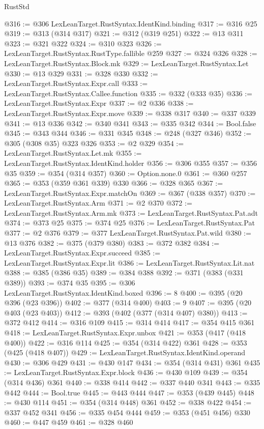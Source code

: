 \begin{lexlean}{RustStd}
\begin{coremodule}
@316 := @306 LexLeanTarget.RustSyntax.IdentKind.binding
@317 := @316 @25
@319 := @313 (@314 @317)
@321 := @312 (@319 @251)
@322 := @13 @311
@323 := @321 @322
@324 := @310 @323
@326 := LexLeanTarget.RustSyntax.RustType.fallible @259
@327 := @324 @326
@328 := LexLeanTarget.RustSyntax.Block.mk
@329 := LexLeanTarget.RustSyntax.Let
@330 := @13 @329
@331 := @328 @330
@332 := LexLeanTarget.RustSyntax.Expr.call
@333 := LexLeanTarget.RustSyntax.Callee.function
@335 := @332 (@333 @35)
@336 := LexLeanTarget.RustSyntax.Expr
@337 := @2 @336
@338 := LexLeanTarget.RustSyntax.Expr.move
@339 := @338 @317
@340 := @337 @339
@341 := @13 @336
@342 := @340 @341
@343 := @335 @342
@344 := Bool.false
@345 := @343 @344
@346 := @331 @345
@348 := @248 (@327 @346)
@352 := @305 (@308 @35) @323 @326
@353 := @2 @329
@354 := LexLeanTarget.RustSyntax.Let.mk
@355 := LexLeanTarget.RustSyntax.IdentKind.holder
@356 := @306 @355
@357 := @356 @35
@359 := @354 (@314 @357)
@360 := Option.none.{0}
@361 := @360 @257
@365 := @353 (@359 @361 @339) @330
@366 := @328 @365
@367 := LexLeanTarget.RustSyntax.Expr.matchOn
@369 := @367 (@338 @357)
@370 := LexLeanTarget.RustSyntax.Arm
@371 := @2 @370
@372 := LexLeanTarget.RustSyntax.Arm.mk
@373 := LexLeanTarget.RustSyntax.Pat.adt
@374 := @373 @25
@375 := @374 @25
@376 := LexLeanTarget.RustSyntax.Pat
@377 := @2 @376
@379 := @377 LexLeanTarget.RustSyntax.Pat.wild
@380 := @13 @376
@382 := @375 (@379 @380)
@383 := @372 @382
@384 := LexLeanTarget.RustSyntax.Expr.succeed
@385 := LexLeanTarget.RustSyntax.Expr.lit
@386 := LexLeanTarget.RustSyntax.Lit.nat
@388 := @385 (@386 @35)
@389 := @384 @388
@392 := @371 (@383 (@331 @389))
@393 := @374 @35
@395 := @306 LexLeanTarget.RustSyntax.IdentKind.boxed
@396 := 8
@400 := @395 (@20 @396 (@23 @396))
@402 := @377 (@314 @400)
@403 := 9
@407 := @395 (@20 @403 (@23 @403))
@412 := @393 (@402 (@377 (@314 @407) @380))
@413 := @372 @412
@414 := @316 @109
@415 := @314 @414
@417 := @354 @415 @361
@418 := LexLeanTarget.RustSyntax.Expr.unbox
@421 := @353 (@417 (@418 @400))
@422 := @316 @114
@425 := @354 (@314 @422) @361
@428 := @353 (@425 (@418 @407))
@429 := LexLeanTarget.RustSyntax.IdentKind.operand
@430 := @306 @429
@431 := @430 @147
@434 := @354 (@314 @431) @361
@435 := LexLeanTarget.RustSyntax.Expr.block
@436 := @430 @109
@439 := @354 (@314 @436) @361
@440 := @338 @414
@442 := @337 @440 @341
@443 := @335 @442
@444 := Bool.true
@445 := @443 @444
@447 := @353 (@439 @445)
@448 := @430 @114
@451 := @354 (@314 @448) @361
@452 := @338 @422
@454 := @337 @452 @341
@456 := @335 @454 @444
@459 := @353 (@451 @456) @330
@460 := @447 @459
@461 := @328 @460

\end{coremodule}
\end{lexlean}
